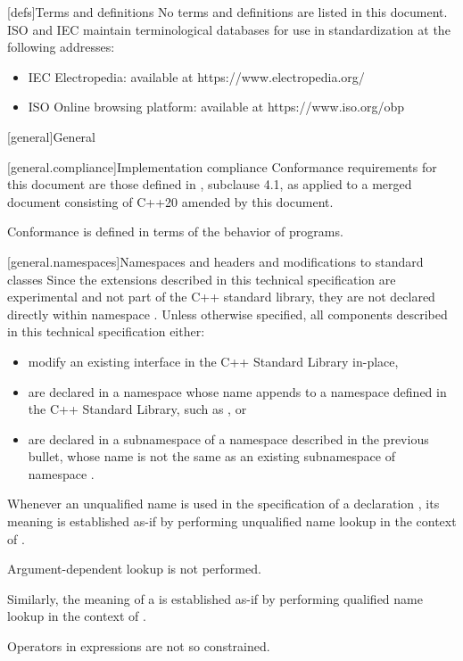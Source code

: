[defs]{Terms and definitions}
\pnum
{}%
No terms and definitions are listed in this document. ISO and IEC maintain
terminological databases for use in standardization at the following addresses:

\begin{itemize}
    \item IEC Electropedia: available at https://www.electropedia.org/
    \item ISO Online browsing platform: available at https://www.iso.org/obp
\end{itemize}

[general]{General}

[general.compliance]{Implementation compliance}
\pnum
Conformance requirements for this document are those defined in {\cppstddocno}, subclause 4.1, as applied to a merged document consisting of C++20 amended by this document.
\begin{note}
Conformance is defined in terms of the behavior of programs.
\end{note}

[general.namespaces]{Namespaces and headers and modifications to standard classes}
\pnum
Since the extensions described in this technical specification are experimental and not part of the C++ standard library, they are not declared directly within namespace . Unless otherwise specified, all components described in this technical specification either:

\begin{itemize}
    \item modify an existing interface in the C++ Standard Library in-place,
    \item are declared in a namespace whose name appends  to a namespace defined in the C++ Standard Library, such as , or
    \item are declared in a subnamespace of a namespace described in the previous bullet, whose name is not the same as an existing subnamespace of namespace .
\end{itemize}

\pnum
Whenever an unqualified name is used
in the specification of a declaration ,
its meaning is established
as-if by performing unqualified name lookup
in the context of .
\begin{note}
Argument-dependent lookup is not performed.
\end{note}
Similarly, the meaning of a  is established
as-if by performing qualified name lookup
in the context of .
\begin{note}
Operators in expressions are not so constrained.
\end{note}

